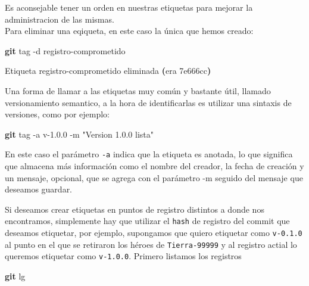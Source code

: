 \documentclass[
]{book}
\newenvironment{Shaded}{\begin{snugshade}}{\end{snugshade}}
\newcommand{\AttributeTok}[1]{\textcolor[rgb]{0.13,0.29,0.53}{#1}}
\newcommand{\ErrorTok}[1]{\textcolor[rgb]{0.64,0.00,0.00}{\textbf{#1}}}
\newcommand{\ExtensionTok}[1]{#1}
\newcommand{\FunctionTok}[1]{\textcolor[rgb]{0.13,0.29,0.53}{\textbf{#1}}}
\newcommand{\KeywordTok}[1]{\textcolor[rgb]{0.13,0.29,0.53}{\textbf{#1}}}
\newcommand{\NormalTok}[1]{#1}
\newcommand{\StringTok}[1]{\textcolor[rgb]{0.31,0.60,0.02}{#1}}
\begin{document}
Es aconsejable tener un orden en nuestras etiquetas para mejorar la administracion de las mismas.\\
Para eliminar una eqiqueta, en este caso la única que hemos creado:

\begin{Shaded}
\begin{Highlighting}[]
\FunctionTok{git}\NormalTok{ tag }\AttributeTok{{-}d}\NormalTok{ registro{-}comprometido}
\end{Highlighting}
\end{Shaded}

\begin{Shaded}
\begin{Highlighting}[]
\ExtensionTok{Etiqueta} \StringTok{\textquotesingle{}registro{-}comprometido\textquotesingle{}}\NormalTok{ eliminada }\ErrorTok{(}\ExtensionTok{era}\NormalTok{ 7e666cc}\KeywordTok{)}
\end{Highlighting}
\end{Shaded}

Una forma de llamar a las etiquetas muy común y bastante útil, llamado versionamiento semantico, a la hora de identificarlas es utilizar una sintaxis de versiones, como por ejemplo:

\begin{Shaded}
\begin{Highlighting}[]
\FunctionTok{git}\NormalTok{ tag  }\AttributeTok{{-}a}\NormalTok{ v{-}1.0.0 }\AttributeTok{{-}m} \StringTok{"Version 1.0.0 lista"}
\end{Highlighting}
\end{Shaded}

En este caso el parámetro \texttt{-a} indica que la etiqueta es anotada, lo que significa que almacena más información como el nombre del creador, la fecha de creación y un mensaje, opcional, que se agrega con el parámetro -m seguido del mensaje que deseamos guardar.

Si deseamos crear etiquetas en puntos de registro distintos a donde nos encontramos, simplemente hay que utilizar el \texttt{hash} de registro del commit que deseamos etiquetar, por ejemplo, supongamos que quiero etiquetar como \texttt{v-0.1.0} al punto en el que se retiraron los héroes de \texttt{Tierra-99999} y al registro actial lo queremos etiquetar como \texttt{v-1.0.0}. Primero listamos los registros

\begin{Shaded}
\begin{Highlighting}[]
\FunctionTok{git}\NormalTok{ lg}
\end{Highlighting}
\end{Shaded}
\end{document}
